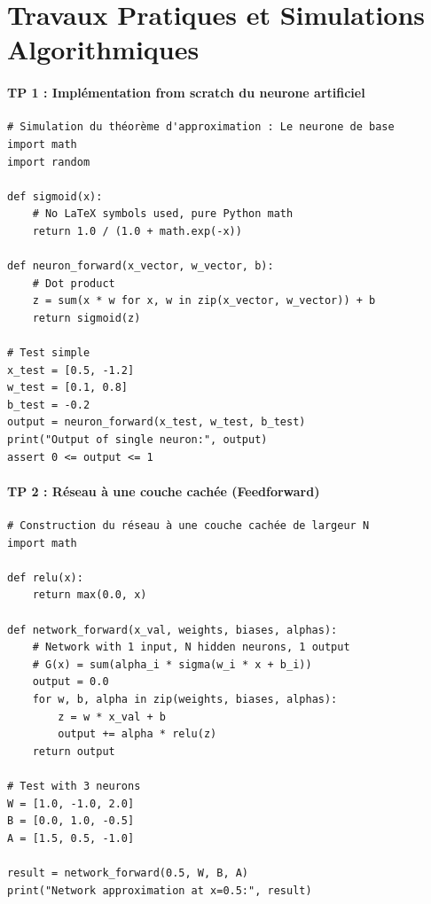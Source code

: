 \documentclass[11pt,a4paper]{article}
\begin{document}
\vspace{1cm}


\newpage
\part{Travaux Pratiques et Simulations Algorithmiques}
\subsection*{TP 1 : Implémentation from scratch du neurone artificiel}

\begin{lstlisting}
# Simulation du théorème d'approximation : Le neurone de base
import math
import random

def sigmoid(x):
    # No LaTeX symbols used, pure Python math
    return 1.0 / (1.0 + math.exp(-x))

def neuron_forward(x_vector, w_vector, b):
    # Dot product
    z = sum(x * w for x, w in zip(x_vector, w_vector)) + b
    return sigmoid(z)

# Test simple
x_test = [0.5, -1.2]
w_test = [0.1, 0.8]
b_test = -0.2
output = neuron_forward(x_test, w_test, b_test)
print("Output of single neuron:", output)
assert 0 <= output <= 1

\end{lstlisting}

\vspace{1cm}
\subsection*{TP 2 : Réseau à une couche cachée (Feedforward)}

\begin{lstlisting}
# Construction du réseau à une couche cachée de largeur N
import math

def relu(x):
    return max(0.0, x)

def network_forward(x_val, weights, biases, alphas):
    # Network with 1 input, N hidden neurons, 1 output
    # G(x) = sum(alpha_i * sigma(w_i * x + b_i))
    output = 0.0
    for w, b, alpha in zip(weights, biases, alphas):
        z = w * x_val + b
        output += alpha * relu(z)
    return output

# Test with 3 neurons
W = [1.0, -1.0, 2.0]
B = [0.0, 1.0, -0.5]
A = [1.5, 0.5, -1.0]

result = network_forward(0.5, W, B, A)
print("Network approximation at x=0.5:", result)

\end{lstlisting}
\end{document}
